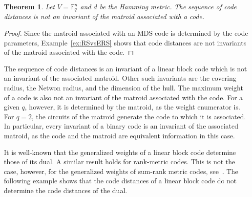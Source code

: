 \documentclass[12pt]{amsart}
\numberwithin{equation}{section}
\newtheorem{theorem}{Theorem}[section]
\theoremstyle{definition}
\begin{document}
\begin{theorem}\label{thm:notinvariant}
Let $V=\mathbb{F}_q^n$ and $d$ be the Hamming metric. The sequence of code distances is not an invariant of the matroid associated with a code.
\end{theorem}

\begin{proof}
Since the matroid associated with an MDS code is determined by the code parameters, Example~\ref{ex:RSvsERS} shows that code distances are not invariants of the matroid associated with the code. 
\end{proof}

The sequence of code distances is an invariant of a linear block code which is not an invariant of the associated matroid. Other such invariants are the covering radius, the Netwon radius, and the dimension of the hull. The maximum weight of a code is also not an invariant of the matroid associated with the code. For a given $q$, however, it is determined by the matroid, as the weight enumerator is. For $q=2$, the circuits of the matroid generate the code to which it is associated. In particular, every invariant of a binary code is an invariant of the associated matroid, as the code and the matroid are equivalent information in this case.

\medskip

It is well-known that the generalized weights of a linear block code determine those of its dual. A similar result holds for rank-metric codes. This is not the case, however, for the generalized weights of sum-rank metric codes, see~\cite[Example V.10]{CGLLMS22}. The following example shows that the code distances of a linear block code do not determine the code distances of the dual.
\end{document}
